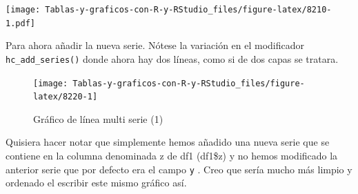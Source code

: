 \documentclass[
]{book}
\newenvironment{Shaded}{\begin{snugshade}}{\end{snugshade}}
\newcommand{\AttributeTok}[1]{\textcolor[rgb]{0.77,0.63,0.00}{#1}}
\newcommand{\ConstantTok}[1]{\textcolor[rgb]{0.00,0.00,0.00}{#1}}
\newcommand{\FunctionTok}[1]{\textcolor[rgb]{0.00,0.00,0.00}{#1}}
\newcommand{\NormalTok}[1]{#1}
\newcommand{\SpecialCharTok}[1]{\textcolor[rgb]{0.00,0.00,0.00}{#1}}
\newcommand{\StringTok}[1]{\textcolor[rgb]{0.31,0.60,0.02}{#1}}
\begin{document}
\texttt{[image: Tablas-y-graficos-con-R-y-RStudio\_files/figure-latex/8210-1.pdf]}

Para ahora añadir la nueva serie. Nótese la variación en el modificador \texttt{hc\_add\_series()} donde ahora hay dos líneas, como si de dos capas se tratara.

\begin{Shaded}
\end{Shaded}

\begin{figure}[H]

{\centering \texttt{[image: Tablas-y-graficos-con-R-y-RStudio\_files/figure-latex/8220-1]} 

}

\caption{Gráfico de línea multi serie (1)}\label{fig:8220}
\end{figure}

Quisiera hacer notar que simplemente hemos añadido una nueva serie que se contiene en la columna denominada z de df1 (df1\$z) y no hemos modificado la anterior serie que por defecto era el campo \texttt{y} . Creo que sería mucho más limpio y ordenado el escribir este mismo gráfico así.
\end{document}
